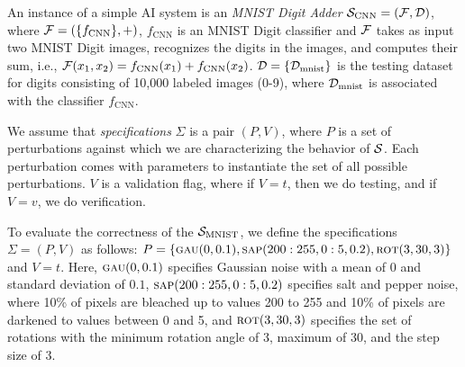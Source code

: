 \begin{example}
  \label{ex:mnist-adder}
  An instance of a simple AI system is an \emph{MNIST Digit Adder} $\S_{\text{CNN}} = (\F,\D)$, where $\F = (\{f_{\text{CNN}}\}, +)$, $f_{\text{CNN}}$ is an MNIST Digit classifier and $\F$ takes as input two MNIST Digit images, recognizes the digits in the images, and computes their sum, i.e., $\F(x_1,x_2) = f_{\text{CNN}}(x_1) + f_{\text{CNN}}(x_2)$. $\D = \{ \D_{\text{mnist}} \}$ is the testing dataset for digits consisting of 10,000 labeled images (0-9), where $\D_{\text{mnist}}$ is associated with the classifier $f_{\text{CNN}}$.
  \end{example}
  
  We assume that \emph{specifications} $\Sigma$ is a pair $(P, V)$, where $P$ is a set of perturbations against which we are characterizing the behavior of $\S$. Each perturbation comes with parameters to instantiate the set of all possible perturbations. $V$ is a validation flag, where if $V=t$, then we do testing, and if $V=v$, we do verification.
  
  \begin{example}
  To evaluate the correctness of the  $\S_{\text{MNIST}}$, we define the specifications $\Sigma = (P, V)$ as follows: $P = \{\gaussian(0,0.1), \saltpepper(200:255, 0:5, 0.2), \rotation(3,30,3)\}$ and $V=t$. Here, $\gaussian(0,0.1)$ specifies Gaussian noise with a mean of $0$ and standard deviation of $0.1$, $\saltpepper(200:255,0:5,0.2)$ specifies salt and pepper noise, where 10\% of pixels are bleached up to values 200 to 255 and 10\% of pixels are darkened to values between 0 and 5, and $\rotation(3,30,3)$ specifies the set of rotations with the minimum rotation angle of 3, maximum of 30, and the step size of 3.
  \end{example}
  

\smallskip\noindent%


